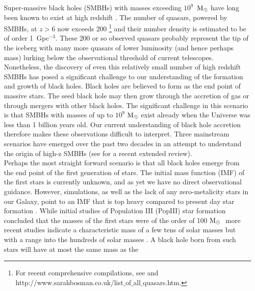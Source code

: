 \documentclass[graphics, twocolumn, usenatbib]{mn2e}
\newcommand{\msolar} {$\rm{M_{\odot}}~$}
\begin{document}
Super-massive black holes (SMBHs) with masses exceeding $10^{9}$~\msolar have long been known to
exist at high redshift \citep[e.g.][]{Fan_2001, Dietrich_2002, Fan_2003, Vestergaard_2004,
  Fan_2004, Fan_06}. The number of quasars, powered by SMBHs, at $z > 6$ now exceeds
200 \citep{Matsuoka_2019}\footnote{For recent comprehensive compilations, see \citet{Inayoshi_2020} and
http://www.sarahbosman.co.uk/list$\_$of$\_$all$\_$quasars.htm.}
and their number
density is estimated to be of order 1~Gpc$^{-3}$. These 200 or so observed quasars probably
represent the tip of the iceberg with many more quasars of lower luminosity (and hence perhaps mass)
lurking below the observational threshold of current telescopes. \\
\indent Nonetheless, the discovery of even this relatively small number of high redshift SMBHs
has posed a significant challenge to our understanding of the formation and growth of black holes.
Black holes are believed to form as the end point of massive stars. The seed black hole may then grow through the
accretion of gas or through mergers with other black holes. The significant challenge in this
scenario is that SMBHs with masses of up to $10^{9}$ \msolar exist \citep[e.g][]{Banados_2018} already when
the Universe was less than 1 billion years old. Our current understanding of black hole accretion
therefore makes these observations difficult to interpret. Three mainstream scenarios have
emerged over the past two decades in an attempt to understand the origin of high-z SMBHs (see \citealt{Inayoshi_2020} for a recent extended review). \\
\indent Perhaps the most straight forward scenario is that all black holes emerge from the end
point of the first generation of stars. The initial mass function (IMF) of the first stars
is currently unknown, and as yet we have no direct observational guidance. However, simulations, as well as the lack of any zero-metalicity stars in our Galaxy, point to an IMF that
is top heavy compared to present day star formation \citep{Yoshida_2006, Turk_2009,
  Clark_2011a, Hirano_2014}. While initial studies of Population III (PopIII) star formation
concluded that the masses of the first stars were of the order of 100 \msolar \citep{Bromm_1999,
  Abel_2002, Bromm_2002} more recent studies indicate a characteristic mass of a few tens of solar
masses but with a range into the hundreds of solar masses \citep{Stacy_2010, Stacy_2012, Stacy_2014,
  Hirano_2014,Hirano_2015}. A black hole born from such stars will have at most the same mass as the
\end{document}
